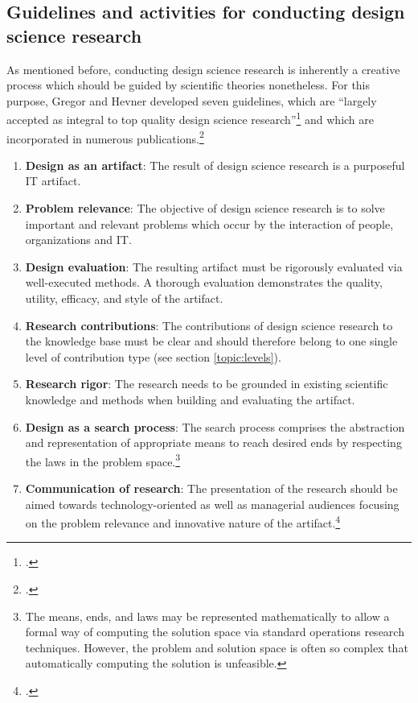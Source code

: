 \subsection{Guidelines and activities for conducting design science research} \label{subsec:GuidelinesDesignScience}
As mentioned before, conducting design science research is inherently a creative process which should be guided by scientific theories nonetheless. For this purpose, Gregor and Hevner developed seven guidelines, which are \enquote{largely accepted as integral to top quality design science research}\footcite[p.19]{HevnerDesignResearchInformation2010} and which are incorporated in numerous publications.\footcites[Cf.][p.20 et seqq]{PfeffersDesignScienceResearch2007}

\begin{enumerate}
    \item \textbf{Design as an artifact}: The result of design science research is a purposeful \ac{IT} artifact.
    \item \textbf{Problem relevance}: The objective of design science research is to solve important and relevant problems which occur by the interaction of people, organizations and \ac{IT}.
    \item \textbf{Design evaluation}: The resulting artifact must be rigorously evaluated via well-executed methods. A thorough evaluation demonstrates the quality, utility, efficacy, and style of the artifact.
    \item \textbf{Research contributions}: The contributions of design science research to the knowledge base must be clear and should therefore belong to one single level of contribution type (see section \ref{topic:levels}).
    \item \textbf{Research rigor}: The research needs to be grounded in existing scientific knowledge and methods when building and evaluating the artifact.
    \item \textbf{Design as a search process}: The search process comprises the abstraction and representation of appropriate means to reach desired ends by respecting the laws in the problem space.\footnote{The means, ends, and laws may be represented mathematically to allow a formal way of computing the solution space via standard operations research techniques. However, the problem and solution space is often so complex that automatically computing the solution is unfeasible.}
    \item \textbf{Communication of research}: The presentation of the research should be aimed towards technology-oriented as well as managerial audiences focusing on the problem relevance and innovative nature of the artifact.\footcites[Cf.][p.iv]{ZmudEditorComments1997}[cf.][p.82 et seqq]{HevnerDesignScienceResearch2004}[cf.][p.viii]{WeberEditorCommentsStill2003}
\end{enumerate}

